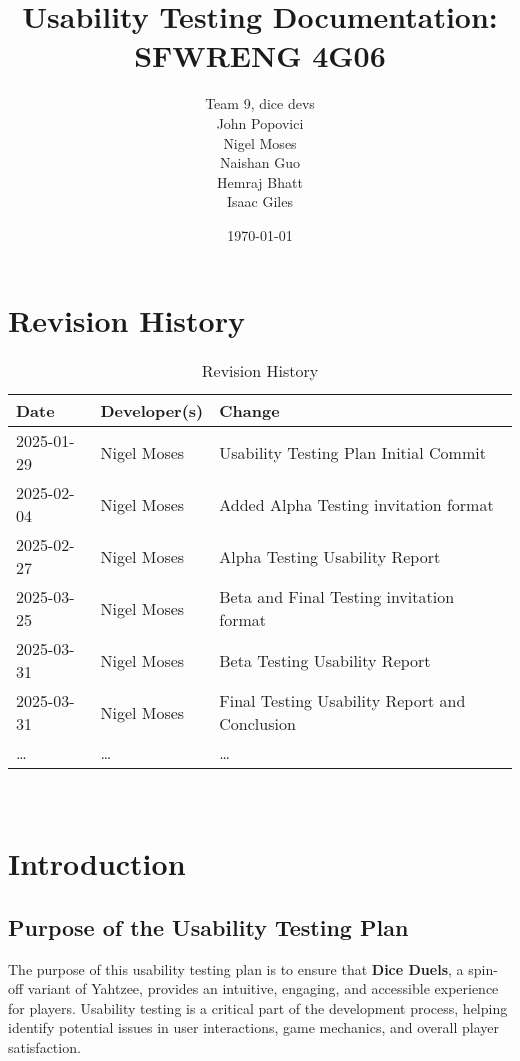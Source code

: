 \documentclass[12pt, titlepage]{article}
\date{}
\title{Usability Testing Documentation: SFWRENG 4G06}
\author{Team 9, dice devs\\
John Popovici\\
Nigel Moses\\
Naishan Guo\\
Hemraj Bhatt\\
Isaac Giles}
\date{\today}
\begin{document}
	
\maketitle


\section{Revision History}

\begin{table}[hp]
\caption{Revision History} \label{TblRevisionHistory}
\begin{tabularx}{\textwidth}{llX}
\toprule
\textbf{Date} & \textbf{Developer(s)} & \textbf{Change}\\
\midrule
2025-01-29 & Nigel Moses & Usability Testing Plan Initial Commit\\
2025-02-04 & Nigel Moses & Added Alpha Testing invitation format\\
2025-02-27 & Nigel Moses & Alpha Testing Usability Report\\
2025-03-25 & Nigel Moses & Beta and Final Testing invitation format\\
2025-03-31 & Nigel Moses & Beta Testing Usability Report\\
2025-03-31 & Nigel Moses & Final Testing Usability Report and Conclusion\\
\dots & \dots & \dots \\
\bottomrule
\end{tabularx}
\end{table}

~\newpage

\newpage

\section{Introduction}

\subsection{Purpose of the Usability Testing Plan}
The purpose of this usability testing plan is to ensure that \textbf{Dice Duels}, a spin-off variant of Yahtzee, provides an intuitive, engaging, and accessible experience for players. Usability testing is a critical part of the development process, helping identify potential issues in user interactions, game mechanics, and overall player satisfaction. 
\end{document}
